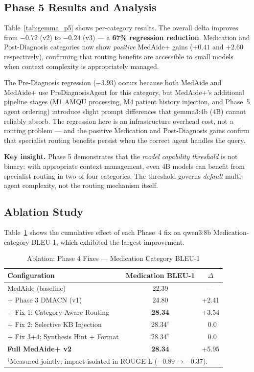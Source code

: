 \documentclass[conference]{IEEEtran}
\begin{document}
\subsection{Phase 5 Results and Analysis}

Table~\ref{tab:gemma_p5} shows per-category results. The overall delta improves from $-0.72$ (v2) to $-0.24$ (v3) — a \textbf{67\% regression reduction}. Medication and Post-Diagnosis categories now show \textit{positive} MedAide+ gains ($+0.41$ and $+2.60$ respectively), confirming that routing benefits are accessible to small models when context complexity is appropriately managed.

The Pre-Diagnosis regression ($-3.93$) occurs because both MedAide and MedAide+ use PreDiagnosisAgent for this category, but MedAide+'s additional pipeline stages (M1 AMQU processing, M4 patient history injection, and Phase~5 agent ordering) introduce slight prompt differences that gemma3:4b (4B) cannot reliably absorb. The regression here is an infrastructure overhead cost, not a routing problem — and the positive Medication and Post-Diagnosis gains confirm that specialist routing benefits persist when the correct agent handles the query.

\textbf{Key insight.} Phase 5 demonstrates that the \textit{model capability threshold} is not binary: with appropriate context management, even 4B models can benefit from specialist routing in two of four categories. The threshold governs \textit{default} multi-agent complexity, not the routing mechanism itself.

\subsection{Ablation Study}

Table~\ref{tab:ablation} shows the cumulative effect of each Phase~4 fix on qwen3:8b Medication-category BLEU-1, which exhibited the largest improvement.

\begin{table}[t]
\centering
\caption{Ablation: Phase 4 Fixes — Medication Category BLEU-1}
\label{tab:ablation}
\begin{tabular}{lcc}
\toprule
\textbf{Configuration} & \textbf{Medication BLEU-1} & \textbf{$\Delta$} \\
\midrule
MedAide (baseline) & 22.39 & — \\
+ Phase 3 DMACN (v1) & 24.80 & +2.41 \\
+ Fix 1: Category-Aware Routing & \textbf{28.34} & +3.54 \\
+ Fix 2: Selective KB Injection & 28.34$^\dagger$ & ~0.0 \\
+ Fix 3+4: Synthesis Hint + Format & 28.34$^\dagger$ & ~0.0 \\
\midrule
\textbf{Full MedAide+ v2} & \textbf{28.34} & +5.95 \\
\bottomrule
\multicolumn{3}{l}{$^\dagger$Measured jointly; impact isolated in ROUGE-L ($-0.89 \rightarrow -0.37$).}
\end{tabular}
\end{table}
\end{document}
